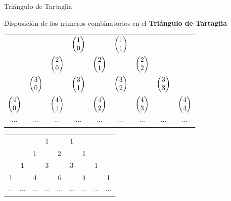 \vspace{5mm}
\begin{myexampleblock}{Triángulo de Tartaglia}
	

Disposición de los números combinatorios en el \textbf{Triángulo de Tartaglia}	
	
	
\begin{table}[H]
\centering
\tiny
\begin{tabular}{ccccccccc}
 &  &  & $\mqty(1\\0)$ &  & $\mqty(1\\1)$ &  &  &  \\
 &  & $\mqty(2\\0)$ &  & $\mqty(2\\1)$ &  & $\mqty(2\\2)$ &  &  \\
 & $\mqty(3\\0)$ &  & $\mqty(3\\1)$ &  & $\mqty(3\\2)$ &  & $\mqty(3\\3)$ &  \\
$\mqty(4\\0)$ &  & $\mqty(4\\1)$ &  & $\mqty(4\\2)$ &  & $\mqty(4\\3)$ &  & $\mqty(4\\4)$ \\
$\cdots$ & $\cdots$ & $\cdots$ & $\cdots$ & $\cdots$ & $\cdots$ & $\cdots$ & $\cdots$ & $\cdots$
\end{tabular}
\end{table}

\vspace{-8mm}

\begin{center}
\begin{Large}
\end{Large}	
\end{center}

\normalsize

\vspace{-8mm}
\begin{table}[H]
\centering
\small
\begin{tabular}{ccccccccc}
 &  &  & 1 &  & 1 &  &  &  \\
 &  & 1 &  & 2 &  & 1 &  &  \\
 & 1 &  & 3 &  & 3 &  & 1 &  \\
1 &  & 4 &  & 6 &  & 4 &  & 1 \\
$\cdots$ & $\cdots$ & $\cdots$ & $\cdots$ & $\cdots$ & $\cdots$ & $\cdots$ & $\cdots$ & $\cdots$
\end{tabular}
\end{table}

\end{myexampleblock}


